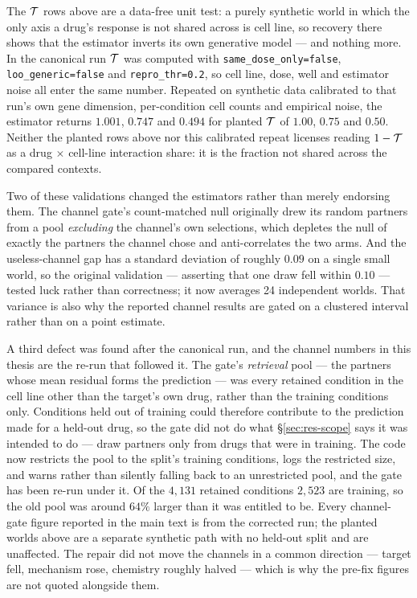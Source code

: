 The $\mathcal{T}$ rows above are a data-free unit test: a purely synthetic world in which the only
axis a drug's response is not shared across is cell line, so recovery there shows that the
estimator inverts its own generative model --- and nothing more. In the canonical run $\mathcal{T}$
was computed with \texttt{same\_dose\_only=false}, \texttt{loo\_generic=false} and
\texttt{repro\_thr=0.2}, so cell line, dose, well and estimator noise all enter the same number.
Repeated on synthetic data calibrated to that run's own gene dimension, per-condition cell counts
and empirical noise, the estimator returns $1.001$, $0.747$ and $0.494$ for planted $\mathcal{T}$ of
$1.00$, $0.75$ and $0.50$. Neither the planted rows above nor this calibrated repeat licenses
reading $1 - \mathcal{T}$ as a drug $\times$ cell-line interaction share: it is the fraction not
shared across the compared contexts.

Two of these validations changed the estimators rather than merely endorsing them. The channel
gate's count-matched null originally drew its random partners from a pool \emph{excluding} the
channel's own selections, which depletes the null of exactly the partners the channel chose and
anti-correlates the two arms. And the useless-channel gap has a standard deviation of roughly $0.09$
on a single small world, so the original validation --- asserting that one draw fell within $0.10$ ---
tested luck rather than correctness; it now averages 24 independent worlds. That variance is also why
the reported channel results are gated on a clustered interval rather than on a point estimate.

A third defect was found after the canonical run, and the channel numbers in this thesis are the
re-run that followed it. The gate's \emph{retrieval} pool --- the partners whose mean residual forms the prediction --- was
every retained condition in the cell line other than the target's own drug, rather than the
training conditions only. Conditions held out of training could therefore contribute to the
prediction made for a held-out drug, so the gate did not do what \S\ref{sec:res-scope} says it was
intended to do --- draw partners only from drugs that were in training. The code now restricts the pool to the split's training
conditions, logs the restricted size, and warns rather than silently falling back to an
unrestricted pool, and the gate has been re-run under it. Of the $4{,}131$ retained conditions
$2{,}523$ are training, so the old pool was around $64\%$ larger than it was entitled to be. Every channel-gate figure reported in the main text is from the corrected run; the planted
worlds above are a separate synthetic path with no held-out split and are unaffected. The repair did
not move the channels in a common direction --- target fell, mechanism rose, chemistry roughly
halved --- which is why the pre-fix figures are not quoted alongside them.

